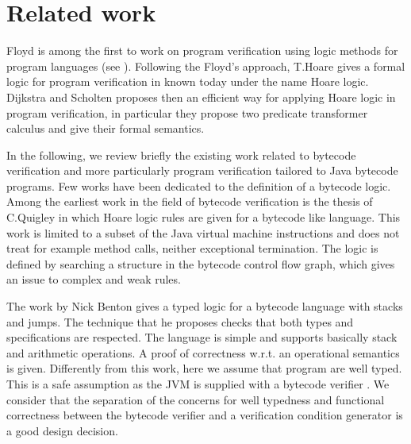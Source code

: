 \section{Related work} \label{relWorkWp}
 Floyd is among the first to work on program verification using logic methods for  program
 languages (see \cite{F67amp}). Following the Floyd's approach, T.Hoare gives a formal logic for program verification in \cite{Hoare69ABC} known
 today under the name Hoare logic. Dijkstra and Scholten \cite{WPCDS} proposes then an efficient way for applying Hoare logic in
 program verification, in particular they propose two predicate transformer calculus and give their formal semantics. 
 
 
 
In the following, we review briefly the existing work related to bytecode verification
 and more particularly program verification tailored to Java bytecode programs. 
Few works have been dedicated to the definition of a bytecode logic. Among the earliest work in the field of bytecode verification 
is the thesis of C.Quigley  \cite{Quigley03PLJ} in which Hoare logic rules are given for a bytecode like language. This work is limited 
to a subset of the Java virtual machine instructions and does not treat for example method calls,
 neither exceptional termination. The logic is defined by searching a structure in the bytecode control flow graph,
 which gives an issue to complex and weak rules.

The work by Nick Benton \cite{B04tlsj} gives a  typed logic for a bytecode language with stacks and jumps. 
The technique that he proposes checks that both types and specifications are respected.
The language is simple and supports basically stack and arithmetic operations. A proof of correctness
w.r.t. an operational semantics is given. Differently from this work, here we assume that program are well typed. 
This is a safe assumption as the JVM is supplied with a bytecode verifier \cite{Ljbc}. 
We consider that the separation of the concerns for well typedness and functional correctness between the bytecode verifier
and a verification condition generator is a good design decision.

